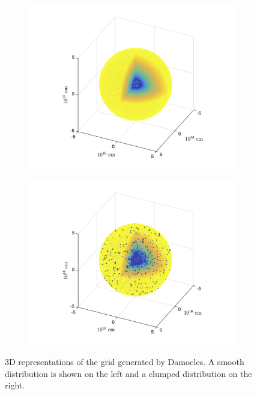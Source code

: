 	\begin{figure}
		\begin{subfigure}{0.4\textwidth}
		\includegraphics[scale=0.5, trim=35mm 5mm 34mm 5mm,clip=true]{chapters/chapter2/smooth_grid}
		\end{subfigure}
		\hspace{18mm}
		\begin{subfigure}{0.4\textwidth}
		\includegraphics[scale=0.5, trim=35mm 5mm 34mm 5mm,clip=true]{chapters/chapter2/clumped_grid}
		\end{subfigure}
		\caption{3D representations of the grid generated by Damocles.  A smooth distribution is shown on the left and a clumped distribution on the right.}
		\label{fig:grid}
	\end{figure}

